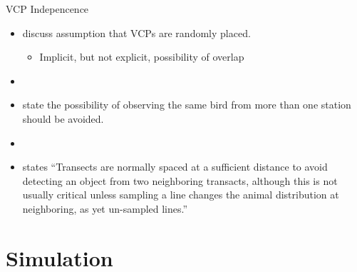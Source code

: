 \documentclass{beamer}
\begin{document}
\begin{frame}{VCP Indepencence}
	\begin{itemize}
	\item \textcite{ramsey1979,buckland1987,thompson2012} discuss assumption that VCPs are randomly placed.
	\begin{itemize}
	\item Implicit, but not explicit, possibility of overlap
	\end{itemize}
	\item[]
	\item \textcite{reynolds1980} state the possibility of observing the same bird from more than one station should be avoided.
	\item[]
	\item \textcite{buckland2001} states ``Transects are normally spaced at a sufficient distance to avoid detecting an object from two neighboring transacts, although this is not usually critical unless sampling a line changes the animal distribution at neighboring, as yet un-sampled lines.''
	\end{itemize}
	
\end{frame}

\section{Simulation}
\end{document}
